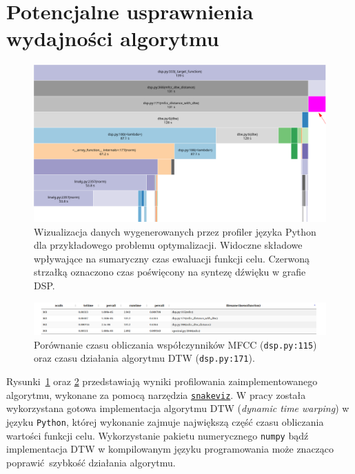 \section{Potencjalne usprawnienia wydajności algorytmu}


\begin{figure}[H]
    \centering
    \includegraphics[width=1.0\linewidth]{rys07/profile_target_function_execution.png}
    \caption{
      Wizualizacja danych wygenerowanych przez profiler języka Python
      dla przykładowego problemu optymalizacji. Widoczne składowe wpływające
      na sumaryczny czas ewaluacji funkcji celu.
      Czerwoną strzałką oznaczono czas poświęcony
      na syntezę dźwięku w grafie DSP.
    }\label{fig:target_function_profiling}
\end{figure}

\begin{figure}[H]
    \centering
    \includegraphics[width=1.0\linewidth]{rys07/mfcc_search.png}
    \caption{
      Porównanie czasu obliczania współczynników MFCC (\texttt{dsp.py:115})
      oraz czasu działania algorytmu DTW (\texttt{dsp.py:171}).
    }\label{fig:mfcc_profiling}
\end{figure}

Rysunki~\ref{fig:target_function_profiling} oraz \ref{fig:mfcc_profiling}
przedstawiają wyniki profilowania zaimplementowanego algorytmu, wykonane
za pomocą narzędzia \href{https://jiffyclub.github.io/snakeviz/}{\texttt{snakeviz}}.
W pracy została wykorzystana gotowa implementacja
algorytmu DTW (\textit{dynamic time warping}) w języku \texttt{Python}, której
wykonanie zajmuje największą część czasu obliczania wartości funkcji celu.
Wykorzystanie pakietu numerycznego \texttt{numpy} bądź implementacja DTW w
kompilowanym języku programowania może znacząco poprawić szybkość działania algorytmu.

